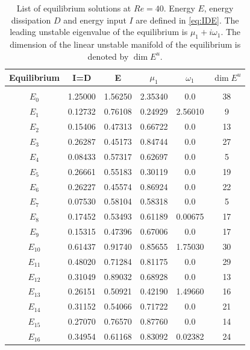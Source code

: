 \documentclass{jfm}
\begin{document}
\begin{table}
\centering
\begin{tabular}{c c c c c c}
Equilibrium &  I=D       & E          & $\mu_1$ & $\omega_1$ &  $\dim E^u$ \\
\hline\\
$E_0$    &  1.25000   & 1.56250    & 2.35340 &   0.0      & 38  \\
$E_1$    &  0.12732   & 0.76108    & 0.24929 &  2.56010   & 9   \\
$E_2$    &  0.15406   & 0.47313    & 0.66722 &   0.0      & 13  \\
$E_3$    &  0.26287   & 0.45173    & 0.84744 &   0.0      & 27  \\
$E_4$    &  0.08433   & 0.57317    & 0.62697 &   0.0      & 5   \\
$E_5$    &  0.26661   & 0.55183    & 0.30119 &   0.0      & 19  \\
$E_6$    &  0.26227   & 0.45574    & 0.86924 &   0.0      & 22  \\
$E_7$    &  0.07530   & 0.58104    & 0.58318 &   0.0      & 5   \\
$E_8$    &  0.17452   & 0.53493    & 0.61189 &   0.00675  & 17  \\
$E_9$    &  0.15315   & 0.47396    & 0.67006 &   0.0      & 17  \\
$E_{10}$ &  0.61437   & 0.91740    & 0.85655 &   1.75030  & 30  \\
$E_{11}$ &  0.48020   & 0.71284    & 0.81175 &   0.0      & 29  \\
$E_{12}$ &  0.31049   & 0.89032    & 0.68928 &   0.0      & 13  \\
$E_{13}$ &  0.26151   & 0.50921    & 0.42190 &   1.49660  & 16  \\
$E_{14}$ &  0.31152   & 0.54066    & 0.71722 &   0.0      & 21  \\
$E_{15}$ &  0.27070   & 0.76570    & 0.87760 &   0.0      & 14  \\
$E_{16}$ &  0.34954   & 0.61168    & 0.83092 &   0.02382  & 24  \\
\end{tabular}
\caption{List of equilibrium solutions at $Re=40$.
Energy $E$, energy dissipation $D$ and energy input $I$ are
	defined in \eqref{eq:IDE}.
    The leading unstable
	eigenvalue of the equilibrium is $\mu_1+i\omega_1$. The dimension of the linear unstable
    manifold of the equilibrium is denoted by $\dim E^u$.}
\label{tab:EQ}
\end{table}
\end{document}
